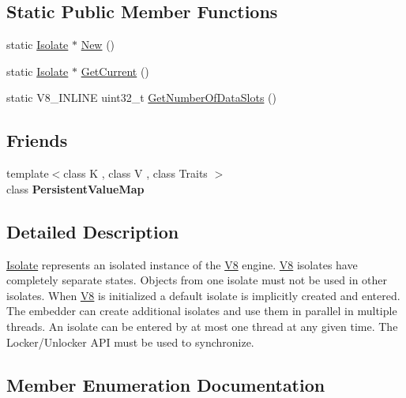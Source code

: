\subsection*{Static Public Member Functions}
\begin{DoxyCompactItemize}
\item 
static \hyperlink{classv8_1_1_isolate}{Isolate} $\ast$ \hyperlink{classv8_1_1_isolate_a36f397e1d09e0122e89641288f348d2d}{New} ()
\item 
static \hyperlink{classv8_1_1_isolate}{Isolate} $\ast$ \hyperlink{classv8_1_1_isolate_aa79441b5da4438221d0f38790c4de2ed}{Get\+Current} ()
\item 
static V8\+\_\+\+I\+N\+L\+I\+N\+E uint32\+\_\+t \hyperlink{classv8_1_1_isolate_a7060092fd45588f4085753b3da1b2c82}{Get\+Number\+Of\+Data\+Slots} ()
\end{DoxyCompactItemize}
\subsection*{Friends}
\begin{DoxyCompactItemize}
\item 
\hypertarget{classv8_1_1_isolate_a401e5cd2db49a67497042617f01fdbc2}{}{\footnotesize template$<$class K , class V , class Traits $>$ }\\class {\bfseries Persistent\+Value\+Map}\label{classv8_1_1_isolate_a401e5cd2db49a67497042617f01fdbc2}

\end{DoxyCompactItemize}


\subsection{Detailed Description}
\hyperlink{classv8_1_1_isolate}{Isolate} represents an isolated instance of the \hyperlink{classv8_1_1_v8}{V8} engine. \hyperlink{classv8_1_1_v8}{V8} isolates have completely separate states. Objects from one isolate must not be used in other isolates. When \hyperlink{classv8_1_1_v8}{V8} is initialized a default isolate is implicitly created and entered. The embedder can create additional isolates and use them in parallel in multiple threads. An isolate can be entered by at most one thread at any given time. The Locker/\+Unlocker A\+P\+I must be used to synchronize. 

\subsection{Member Enumeration Documentation}
\hypertarget{classv8_1_1_isolate_a5ae00cc99d8aca148c6f5f9698c432c9}{}
